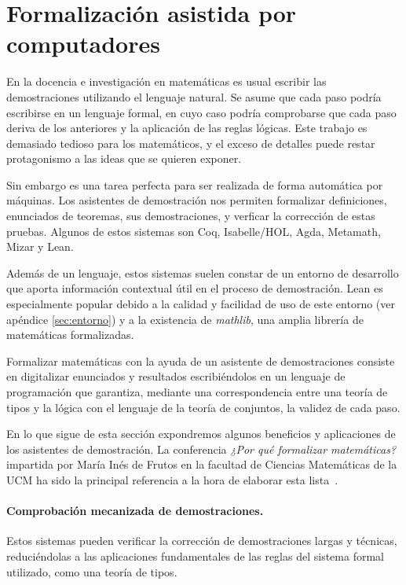 \section{Formalización asistida por computadores}

En la docencia e investigación en matemáticas es usual escribir las
demostraciones utilizando el lenguaje natural. Se asume que cada paso podría
escribirse en un lenguaje formal, en cuyo caso podría comprobarse que cada paso
deriva de los anteriores y la aplicación de las reglas lógicas. Este trabajo es
demasiado tedioso para los matemáticos, y el exceso de detalles puede restar
protagonismo a las ideas que se quieren exponer.

Sin embargo es una tarea perfecta para ser realizada de forma automática
por máquinas. Los asistentes de demostración nos permiten formalizar
definiciones, enunciados de teoremas, sus demostraciones, y verficar la
corrección de estas pruebas. Algunos de estos sistemas son Coq,
Isabelle/HOL, Agda, Metamath, Mizar y Lean.

Además de un lenguaje, estos sistemas suelen constar de un entorno de desarrollo
que aporta información contextual útil en el proceso de demostración. Lean es
especialmente popular debido a la calidad y facilidad de uso de este entorno
(ver apéndice \ref{sec:entorno}) y a la existencia de \textit{mathlib}, una
amplia librería de matemáticas formalizadas.

Formalizar matemáticas con la ayuda de un asistente de demostraciones consiste
en digitalizar enunciados y resultados escribiéndolos en un lenguaje de
programación que garantiza, mediante una correspondencia entre una teoría de
tipos y la lógica con el lenguaje de la teoría de conjuntos, la validez de cada
paso.

En lo que sigue de esta sección expondremos algunos beneficios y aplicaciones
de los asistentes de demostración. La conferencia \textit{¿Por qué formalizar
	matemáticas?} impartida por María Inés de Frutos en la facultad de
Ciencias Matemáticas de la UCM ha sido la principal referencia a la hora de
elaborar esta lista~\cite{defrutosPorQueFormalizar2023a}.

\paragraph{Comprobación mecanizada de demostraciones.}

Estos sistemas pueden verificar la corrección de demostraciones largas y
técnicas, reduciéndolas a las aplicaciones fundamentales de las reglas del
sistema formal utilizado, como una teoría de tipos.

